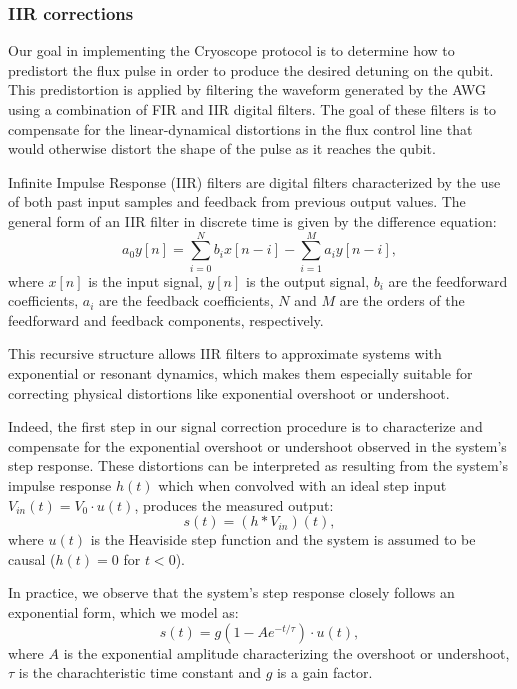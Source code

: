 \subsubsection{IIR corrections}\label{subsec:IIR}
Our goal in implementing the Cryoscope protocol is to determine how to predistort the flux pulse in order to produce the desired detuning on the qubit. 
This predistortion is applied by filtering the waveform generated by the AWG using a combination of FIR and IIR digital filters. 
The goal of these filters is to compensate for the linear-dynamical distortions in the flux control line that would otherwise distort the shape of the pulse as it reaches the qubit.

Infinite Impulse Response (IIR) filters are digital filters characterized by the use of both past input samples and feedback from previous output values.
The general form of an IIR filter in discrete time is given by the difference equation:
\begin{equation}
        a_0 y[n] = \sum_{i=0}^{N} b_i x[n - i] - \sum_{i=1}^{M} a_i y[n - i],
\end{equation}
where $x[n]$ is the input signal, $y[n]$ is the output signal, $b_i$ are the feedforward coefficients, $a_i$ are the feedback coefficients, $N$ and $M$ are the orders of the feedforward and feedback components, respectively.

This recursive structure allows IIR filters to approximate systems with exponential or resonant dynamics, which makes them especially suitable for correcting physical distortions like exponential overshoot or undershoot.

Indeed, the first step in our signal correction procedure is to characterize and compensate for the exponential overshoot or undershoot observed in the system's step response. 
These distortions can be interpreted as resulting from the system's impulse response $h(t)$ which when convolved with an ideal step input $V_{in}(t) = V_0\cdot u(t)$, produces the measured output:
\begin{equation}
    s(t) = (h \ast V_{in})(t),
\end{equation}
where $u(t)$ is the Heaviside step function and the system is assumed to be causal ($h(t)=0$ for $t<0$).

In practice, we observe that the system's step response closely follows an exponential form, which we model as:
\begin{equation}
    s(t) = g(1-Ae^{-t/\tau})\cdot u(t),
\end{equation}
where $A$ is the exponential amplitude characterizing the overshoot or undershoot, $\tau$ is the charachteristic time constant and $g$ is a gain factor.

